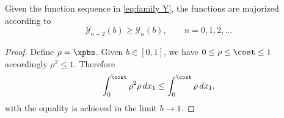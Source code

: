 \begin{myTheorem}  
Given the function sequence in \eqref{eq:family Y}, the functions are majorized according to
  \begin{equation}
    \mathcal{Y}_{n+2}(b) \ge \mathcal{Y}_{n}(b), \qquad n = 0, 1, 2, \dots
  \end{equation}
  \label{th:response}
\end{myTheorem}  %
\begin{proof}  %
Define $\rho = \xpbs$. Given $b\in[0,1]$, we have $0 \le \rho \le \cost \le 1$ accordingly $\rho^{2} \le 1$. Therefore
  \begin{equation}
    \int_{0}^{\cost} \rho^{2} \rho \, dx_{1} \le \int_{0}^{\cost} \rho \, dx_{1} ,
  \end{equation}
with the equality is achieved in the limit $b\to 1$.
\end{proof}  %

\endinput %